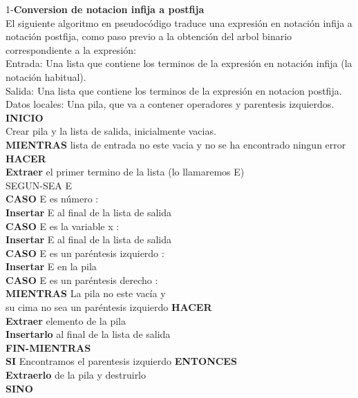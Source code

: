 \documentclass[12pt]{article}
\begin{document}
\begin{tabla}
1-\textbf{Conversion de notacion infija a postfija}\\

El siguiente algoritmo en pseudocódigo traduce una expresión en notación infija a notación postfija, como paso previo a la obtención del arbol binario correspondiente a la expresión:\\

Entrada: Una lista que contiene los terminos de la expresión en notación infija (la notación habitual).\\
Salida: Una lista que contiene los terminos de la expresión en notacion postfija.\\
Datos locales: Una pila, que va a contener operadores y parentesis izquierdos.\\

\textbf{INICIO}\\
     Crear pila y la lista de salida, inicialmente vacias.\\
\textbf{MIENTRAS} lista de entrada no este vacia y no se ha encontrado ningun error \textbf{HACER}\\
\textbf{Extraer} el primer termino de la lista (lo llamaremos E)\\
       SEGUN-SEA E\\
	 \textbf{CASO} E es número :\\
	   \textbf{Insertar} E al final de la lista de salida\\
	 \textbf{CASO} E es la variable x : \\
	  \textbf{Insertar} E al final de la lista de salida \\
	 \textbf{CASO} E es un paréntesis izquierdo :\\
          \textbf{Insertar} E en la pila\\
	 \textbf{CASO} E es un paréntesis derecho : \\
          \textbf{MIENTRAS} La pila no este vacía y \\ 
		    su cima no sea un paréntesis izquierdo \textbf{HACER} \\
	     \textbf{Extraer} elemento de la pila \\
	     \textbf{Insertarlo} al final de la lista de salida\\
	  \textbf{FIN-MIENTRAS}\\
	   \textbf{SI} Encontramos el parentesis izquierdo \textbf{ENTONCES}\\
	     \textbf{Extraerlo} de la pila y destruirlo\\
	   \textbf{SINO}\\

\end{tabla}
\end{document}
